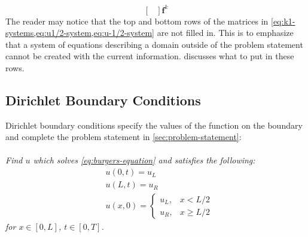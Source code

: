 \begin{subequations}
\begin{equation}
\begin{bmatrix}
        \end{bmatrix}\mathbf{f}^k
    \end{equation}
\end{subequations}
The reader may notice that the top and bottom rows of the matrices in \cref{eq:k1-systems,eq:u1/2-system,eq:u-1/2-system} are not filled in.
This is to emphasize that a system of equations describing a domain outside of the problem statement cannot be created with the current information.
 discusses what to put in these rows.

\subsection{Dirichlet Boundary Conditions}\label{subsec:dirichlet}
Dirichlet boundary conditions specify the values of the function on the boundary and complete the problem statement in \cref{sec:problem-statement}:\\~\\

\noindent
\textit{Find $u$ which solves \cref{eq:burgers-equation} and satisfies the following:
    \begin{equation}
        \label{eq:dirichlet-bc-and-ic}
        \begin{split}
            &u(0,t)=u_L \\
            &u(L,t)=u_R\\
            &u(x,0)=\begin{cases}
                        u_L, & x<L/2\\
                        u_R, & x\geq L/2
            \end{cases}
        \end{split}
    \end{equation}
    for $x\in [0,L]$, $t\in[0,T]$.}\\~\\

